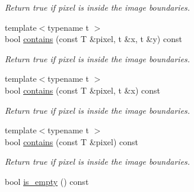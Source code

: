 \begin{DoxyCompactItemize}
\begin{DoxyCompactList}\small\item\em Return {\ttfamily true} if pixel is inside the image boundaries. \end{DoxyCompactList}\item 
\hypertarget{structcimg__library_1_1_c_img_ab37f13efdc00bd2328e6684c83e22554}{{\footnotesize template$<$typename t $>$ }\\bool \hyperlink{structcimg__library_1_1_c_img_ab37f13efdc00bd2328e6684c83e22554}{contains} (const T \&pixel, t \&x, t \&y) const }\label{structcimg__library_1_1_c_img_ab37f13efdc00bd2328e6684c83e22554}

\begin{DoxyCompactList}\small\item\em Return {\ttfamily true} if pixel is inside the image boundaries. \end{DoxyCompactList}\item 
\hypertarget{structcimg__library_1_1_c_img_a92f47e0be745ef5b29c81947c064f3f1}{{\footnotesize template$<$typename t $>$ }\\bool \hyperlink{structcimg__library_1_1_c_img_a92f47e0be745ef5b29c81947c064f3f1}{contains} (const T \&pixel, t \&x) const }\label{structcimg__library_1_1_c_img_a92f47e0be745ef5b29c81947c064f3f1}

\begin{DoxyCompactList}\small\item\em Return {\ttfamily true} if pixel is inside the image boundaries. \end{DoxyCompactList}\item 
\hypertarget{structcimg__library_1_1_c_img_ae08ebc10ca09b0388d126490befa8a7f}{{\footnotesize template$<$typename t $>$ }\\bool \hyperlink{structcimg__library_1_1_c_img_ae08ebc10ca09b0388d126490befa8a7f}{contains} (const T \&pixel) const }\label{structcimg__library_1_1_c_img_ae08ebc10ca09b0388d126490befa8a7f}

\begin{DoxyCompactList}\small\item\em Return {\ttfamily true} if pixel is inside the image boundaries. \end{DoxyCompactList}\item 
\hypertarget{structcimg__library_1_1_c_img_a9c9bc7186ce965d46cbb507cde3fb9d5}{bool \hyperlink{structcimg__library_1_1_c_img_a9c9bc7186ce965d46cbb507cde3fb9d5}{is\-\_\-empty} () const }\label{structcimg__library_1_1_c_img_a9c9bc7186ce965d46cbb507cde3fb9d5}


\end{DoxyCompactItemize}
